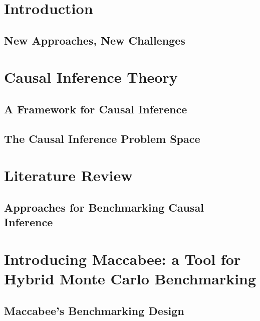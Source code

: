 \documentclass[oneside, fleqn]{book}
\begin{document}
 
\frontmatter


\clearpage
\thispagestyle{empty}

\tableofcontents
 
\mainmatter
\part{Introduction}

\chapter{New Approaches, New Challenges}
\label{chap:intro}



\part{Causal Inference Theory}

\chapter{A Framework for Causal Inference}
\label{chap:framework}


\chapter{The Causal Inference Problem Space}
\label{chap:problemspace}



\part{Literature Review}
\chapter{Approaches for Benchmarking Causal Inference}
\label{chap:litreview}

 
\part{Introducing Maccabee: a Tool for Hybrid Monte Carlo Benchmarking}
\chapter{Maccabee's Benchmarking Design}
\label{chap:macdesign}

\end{document}
